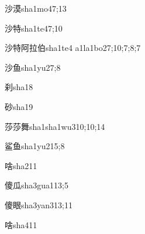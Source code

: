 \begin{verbete}{沙漠}{sha1mo4}{7;13}
\end{verbete}

\begin{verbete}{沙特}{sha1te4}{7;10}
\end{verbete}

\begin{verbete}{沙特阿拉伯}{sha1te4 a1la1bo2}{7;10;7;8;7}
\end{verbete}

\begin{verbete}{沙鱼}{sha1yu2}{7;8}
\end{verbete}

\begin{verbete}{刹}{sha1}{8}
\end{verbete}

\begin{verbete}{砂}{sha1}{9}
\end{verbete}

\begin{verbete}{莎莎舞}{sha1sha1wu3}{10;10;14}
\end{verbete}

\begin{verbete}{鲨鱼}{sha1yu2}{15;8}
\end{verbete}

\begin{verbete}{啥}{sha2}{11}
\end{verbete}

\begin{verbete}{傻瓜}{sha3gua1}{13;5}
\end{verbete}

\begin{verbete}{傻眼}{sha3yan3}{13;11}
\end{verbete}

\begin{verbete}{啥}{sha4}{11}
\end{verbete}

